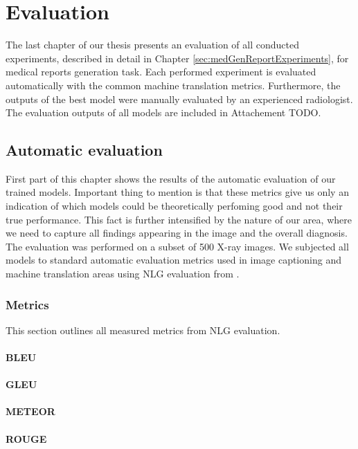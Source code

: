 \chapter{Evaluation}
The last chapter of our thesis presents an evaluation of all conducted experiments, described in detail in Chapter \ref{sec:medGenReportExperiments}, for medical reports generation task. Each performed experiment is evaluated automatically with the common machine translation metrics. Furthermore, the outputs of the best model were manually evaluated by an experienced radiologist. The evaluation outputs of all models are included in Attachement TODO.

\section{Automatic evaluation}
First part of this chapter shows the results of the automatic evaluation of our trained models. Important thing to mention is that these metrics give us only an indication of which models could be theoretically perfoming good and not their true performance. This fact is further intensified by the nature of our area, where we need to capture all findings appearing in the image and the overall diagnosis. \\

The evaluation was performed on a subset of 500 X-ray images. We subjected all models to standard automatic evaluation metrics used in image captioning and machine translation areas using NLG evaluation from \citet{sharma2017nlgeval}.

\subsection{Metrics}
This section outlines all measured metrics from NLG evaluation.
\subsubsection*{BLEU}
\subsubsection*{GLEU}
\subsubsection*{METEOR}
\subsubsection*{ROUGE}
